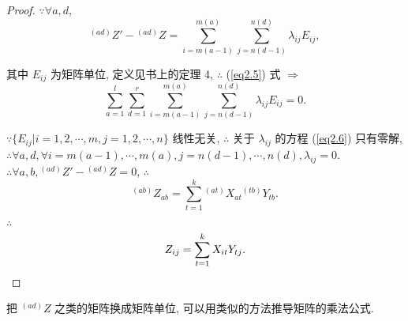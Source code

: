 \documentclass[color=black,device=normal,lang=cn,mode=geye]{elegantnote}
\begin{document}
\begin{proof}
    $\because\forall a,d$,
    \[{}^{(ad)}Z'-{}^{(ad)}Z=\sum\limits_{i=m(a-1)}^{m(a)}\sum\limits_{j=n(d-1)}^{n(d)}\lambda_{ij}E_{ij},\]

    其中 $E_{ij}$ 为矩阵单位, 定义见书上的定理 4, $\therefore$ (\ref{eq2.5}) 式 $\Rightarrow$
    \begin{equation}\label{eq2.6}
        \sum\limits_{a=1}^{l}\sum\limits_{d=1}^{r}\sum\limits_{i=m(a-1)}^{m(a)}\sum\limits_{j=n(d-1)}^{n(d)}\lambda_{ij}E_{ij}=0.
    \end{equation}

    $\because\{E_{ij}|i=1,2,\cdots,m,j=1,2,\cdots,n\}$ 线性无关, $\therefore$ 关于 $\lambda_{ij}$ 的方程 (\ref{eq2.6}) 只有零解, $\therefore\forall a,d,\forall i=m(a-1),\cdots,m(a),j=n(d-1),\cdots,n(d),\lambda_{ij}=0$. $\therefore\forall a,b,{}^{(ad)}Z'-{}^{(ad)}Z=0$, $\therefore$
    \[^{(ab)}Z_{ab}=\sum\limits_{t=1}^k{}^{(at)}X_{at}{}^{(tb)}Y_{tb}.\]

    $\therefore$
    \[Z_{ij}=\sum\limits_{t=1}^kX_{it}Y_{tj}.\qedhere\]
\end{proof}
\begin{note}
    把 $^{(ad)}Z$ 之类的矩阵换成矩阵单位, 可以用类似的方法推导矩阵的乘法公式.
\end{note}
\end{document}
